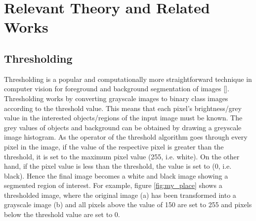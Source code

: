



\chapter{Relevant Theory and Related Works} %

\label{Chapter2} %

\section{Thresholding}
Thresholding is a popular and computationally more straightforward technique in computer vision for foreground and background segmentation of images [\cite{lee1990comparative}]. Thresholding works by converting grayscale images to binary class images according to the threshold value. This means that each pixel’s brightness/grey value in the interested objects/regions of the input image must be known. The grey values of objects and background can be obtained by drawing a greyscale image histogram.
As the operator of the threshold algorithm goes through every pixel in the image, if the value of the respective pixel is greater than the threshold, it is set to the maximum pixel value (255, i.e. white). On the other hand, if the pixel value is less than the threshold, the value is set to (0, i.e. black). Hence the final image becomes a white and black image showing a segmented region of interest. For example, figure \ref{fig:my_place} shows a thresholded image, where the original image (a) has been transformed into a grayscale image (b) and all pixels above the value of 150 are set to 255 and pixels below the threshold value are set to 0. 

